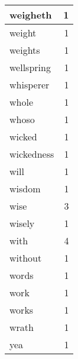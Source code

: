 \begin{center}
\begin{longtable}{l|r}
weigheth & 1\\ \hline 
weight & 1\\ \hline 
weights & 1\\ \hline 
wellspring & 1\\ \hline 
whisperer & 1\\ \hline 
whole & 1\\ \hline 
whoso & 1\\ \hline 
wicked & 1\\ \hline 
wickedness & 1\\ \hline 
will & 1\\ \hline 
wisdom & 1\\ \hline 
wise & 3\\ \hline 
wisely & 1\\ \hline 
with & 4\\ \hline 
without & 1\\ \hline 
words & 1\\ \hline 
work & 1\\ \hline 
works & 1\\ \hline 
wrath & 1\\ \hline 
yea & 1\\ \hline 
\end{longtable}  
\end{center}  


  
\normalsize  

  
  
